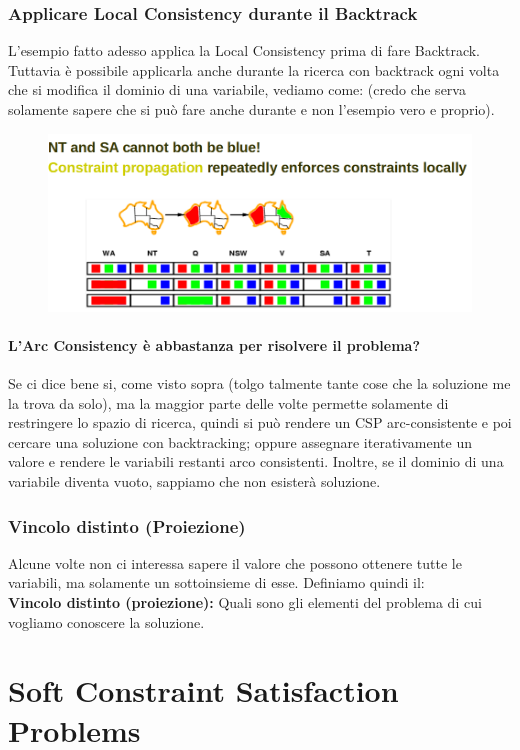 \subsection{Applicare Local Consistency durante il Backtrack}
L'esempio fatto adesso applica la Local Consistency prima di fare Backtrack.
Tuttavia è possibile applicarla anche durante la ricerca con backtrack ogni
volta che si modifica il dominio di una variabile, vediamo come: (credo che
serva solamente sapere che si può fare anche durante e non l'esempio vero e
proprio).
\begin{figure}[H]
    \centering
    \includegraphics[width=12cm, keepaspectratio]{img/Cap3/prova3.png}
\end{figure}

\subsubsection{L'Arc Consistency è abbastanza per risolvere il problema?}
Se ci dice bene si, come visto sopra (tolgo talmente tante cose che la soluzione
me la trova da solo), ma la maggior parte delle volte permette solamente di
restringere lo spazio di ricerca, quindi si può rendere un CSP arc-consistente e
poi cercare una soluzione con backtracking; oppure assegnare iterativamente un
valore e rendere le variabili restanti arco consistenti. Inoltre, se il dominio
di una variabile diventa vuoto, sappiamo che non esisterà soluzione.

\subsection{Vincolo distinto (Proiezione)}
Alcune volte non ci interessa sapere il valore che possono ottenere tutte le
variabili, ma solamente un sottoinsieme di esse. Definiamo quindi il: \\
\textbf{Vincolo distinto (proiezione):} Quali sono gli elementi del problema di
cui vogliamo conoscere la soluzione.

\chapter{Soft Constraint Satisfaction Problems} \label{ch:Soft Constraint
    Satisfaction Problems}
